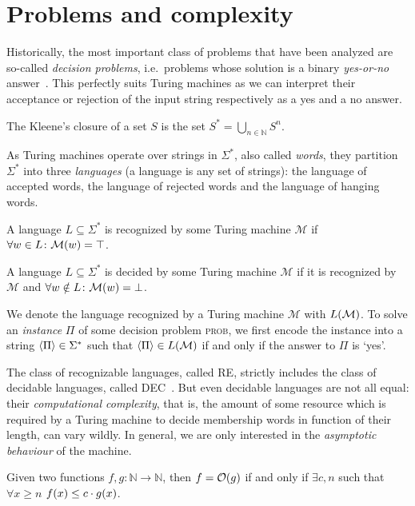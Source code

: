 \section{Problems and complexity}\label{sec:complexity}
Historically, the most important class of problems that have been analyzed are so-called
\emph{decision problems}, i.e.\ problems whose solution is a binary \emph{yes-or-no} 
answer~\cite{Sipser2013}.
This perfectly suits Turing machines as we can interpret their acceptance or rejection of the input 
string respectively as a yes and a no answer.

\begin{definition}
  The Kleene's closure of a set \(S\) is the set \(S^* = \bigcup_{n \in \mathbb{N}}{S^n}\).
\end{definition}

As Turing machines operate over strings in \(\Sigma^*\), also called \emph{words}, they partition 
\(\Sigma^* \) into three \emph{languages} (a language is any set of strings): the language of 
accepted words, the language of rejected words and the language of hanging words.
\begin{definition}
  A language \(L \subseteq \Sigma^*\) is recognized by some Turing machine \(\mathcal{M}\) if 
  \(\forall w \in L\colon \call{\mathcal{M}}{w} = \top \).
\end{definition}
\begin{definition}
  A language \(L \subseteq \Sigma^*\) is decided by some Turing machine \(\mathcal{M}\) if it is 
  recognized by \(\mathcal{M}\) and \(\forall w \notin L\colon \call{\mathcal{M}}{w} = \bot \).
\end{definition}

We denote the language recognized by a Turing machine \(\mathcal{M}\) with \(\call{L}{\mathcal{M}}\).
To solve an \emph{instance} \(\Pi \) of some decision problem \textsc{prob}, we first encode the 
instance into a string \(\left\langle\Pi\right\rangle \in \Sigma^*\) such that 
\(\Encode{\Pi} \in \call{L}{\mathcal{M}}\) if and only if the answer to \(\Pi \) is `yes'.

The class of recognizable languages, called \textsc{RE}, strictly includes the class of decidable 
languages, called \textsc{DEC}~\cite{Turing1937}.
But even decidable languages are not all equal: their \emph{computational complexity}, that is,
the amount of some resource which is required by a Turing machine to decide membership words in 
function of their length, can vary wildly.
In general, we are only interested in the \emph{asymptotic behaviour} of the machine.
\begin{definition}
  Given two functions \(f, g\colon \mathbb{N} \to \mathbb{N}\), then \(f = \BigO{g}\) if 
  and only if \(\exists c,n\) such that \(\forall x \ge n\) \(\call{f}{x} \le c \cdot \call{g}{x}\).
\end{definition}


